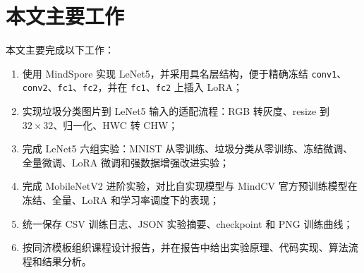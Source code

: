 \section{本文主要工作}

本文主要完成以下工作：

\begin{enumerate}[label=(\arabic*)]
  \item 使用 MindSpore 实现 LeNet5，并采用具名层结构，便于精确冻结 \texttt{conv1}、\texttt{conv2}、\texttt{fc1}、\texttt{fc2}，并在 \texttt{fc1}、\texttt{fc2} 上插入 LoRA；
  \item 实现垃圾分类图片到 LeNet5 输入的适配流程：RGB 转灰度、resize 到 $32\times32$、归一化、HWC 转 CHW；
  \item 完成 LeNet5 六组实验：MNIST 从零训练、垃圾分类从零训练、冻结微调、全量微调、LoRA 微调和强数据增强改进实验；
  \item 完成 MobileNetV2 进阶实验，对比自实现模型与 MindCV 官方预训练模型在冻结、全量、LoRA 和学习率调度下的表现；
  \item 统一保存 CSV 训练日志、JSON 实验摘要、checkpoint 和 PNG 训练曲线；
  \item 按同济模板组织课程设计报告，并在报告中给出实验原理、代码实现、算法流程和结果分析。
\end{enumerate}

